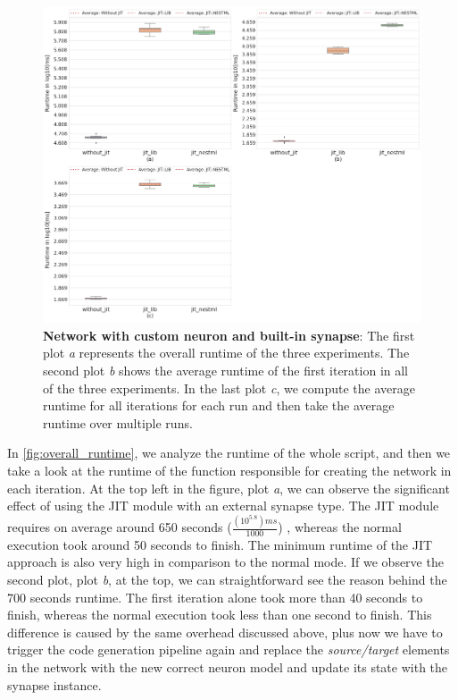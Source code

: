 \begin{figure}[ht!]
    \centering
    \includegraphics[width=\textwidth]{src/pic/three_plots.png}
    \caption{\textbf{Network with custom neuron and built-in synapse}: The first plot \emph{a} represents the overall runtime of the three experiments. The second plot \emph{b} shows the average runtime of the first iteration in all of the three experiments. In the last plot \emph{c}, we compute the average runtime for all iterations for each run and then take the average runtime over multiple runs.}
    \label{fig:overall_runtime}
\end{figure}

In \autoref{fig:overall_runtime}, we analyze the runtime of the whole script, and then we take a look at the runtime of the function responsible for creating the network in each iteration. At the top left in the figure, plot \emph{a}, we can observe the significant effect of using the JIT module with an external synapse type. The JIT module requires on average around 650 seconds ($\frac{(10^{5.8})ms}{1000}$) , whereas the normal execution took around 50 seconds to finish. The minimum runtime of the JIT approach is also very high in comparison to the normal mode. If we observe the second plot, plot \emph{b}, at the top, we can straightforward see the reason behind the 700 seconds runtime. The first iteration alone took more than 40 seconds to finish, whereas the normal execution took less than one second to finish. This difference is caused by the same overhead discussed above, plus now we have to trigger the code generation pipeline again and replace the \emph{source/target} elements in the network with the new correct neuron model and update its state with the synapse instance. 

